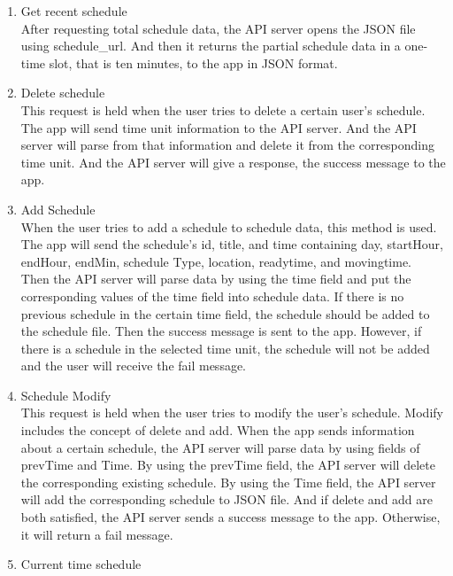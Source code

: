 \documentclass[conference]{IEEEtran}
\begin{document}
\begin{enumerate}[label=\arabic*.]
\begin{enumerate}[label=\arabic*.]
\begin{enumerate}[label=\alph*.]
\begin{enumerate}[label=\roman*.]
            \item {\large{Get recent schedule }} \\
            After requesting total schedule data, the API server opens the JSON file using schedule\_url. And then it returns the partial schedule data in a one-time slot, that is ten minutes, to the app in JSON format.
            \item {\large{Delete schedule }} \\
            This request is held when the user tries to delete a certain user’s schedule. The app will send time unit information to the API server. And the API server will parse from that information and delete it from the corresponding time unit. And the API server will give a response, the success message to the app. \\
            \item {\large{Add Schedule }} \\
            When the user tries to add a schedule to schedule data, this method is used. The app will send the schedule’s id, title, and time containing day, startHour, endHour, endMin, schedule Type, location, readytime, and movingtime. \\
            Then the API server will parse data by using the time field and put the corresponding values of the time field into schedule data. If there is no previous schedule in the certain time field, the schedule should be added to the schedule file. Then the success message is sent to the app. However, if there is a schedule in the selected time unit, the schedule will not be added and the user will receive the fail message. \\
            \item {\large{Schedule Modify }} \\
            This request is held when the user tries to modify the user’s schedule. Modify includes the concept of delete and add. When the app sends information about a certain schedule, the API server will parse data by using fields of prevTime and Time. By using the prevTime field, the API server will delete the corresponding existing schedule. By using the Time field, the API server will add the corresponding schedule to JSON file. And if delete and add are both satisfied, the API server sends a success message to the app. Otherwise, it will return a fail message. \\
            \item {\large{Current time schedule }} \\

\end{enumerate}
\end{enumerate}
\end{enumerate}
\end{enumerate}
\end{document}
